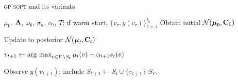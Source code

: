 \newcommand{\bOmega}{\boldsymbol{\Omega}}
\newcommand{\bH}{\mathbf{H}}
\newcommand{\bq}{\mathbf{q}}
\newcommand{\rhos}{\rho}
\newcommand{\cC}{\mathcal{C}}
\newcommand{\blambda}{\boldsymbol{\lambda}}

\newcommand{\COMMENTEQ}[2][4.5em]{%
  \leavevmode\hfill\makebox[#1][l]{//~#2}}



\begin{algorithm}[ht]
	\caption{ \textsc{gp-sopt} and its variants}
	\label{alg:main}
	\begin{algorithmic}[1]
  	\INPUT $\mu_0$, $\mathbf A$, $\omega_0$, $\sigma_n$, $\alpha_t$, $T$;
  	if warm start, $\{v_\tau,y(v_\tau)\}_{\tau=1}^{t_0}$
	\STATE Obtain initial $\mathcal{N}(\boldsymbol \mu_{0},{\mathbf C}_{0})$ 
		\COMMENTEQ{\eqref{eq:generative}}


 	\STATE Update to posterior $\mathcal{N}(\boldsymbol \mu_t, {\mathbf C}_t)$ 
 		\COMMENTEQ{\eqref{eq:var_update}}

 	\STATE $v_{t+1} \leftarrow \operatorname*{\arg\,\max}_{v \in V \setminus S_t} \mu_t(v) + \alpha_{t+1} s_t(v)$

  		\hfill {}

	\STATE Observe $y(v_{t+1})$; include $S_{t+1} \leftarrow S_t \cup \{v_{t+1}\}$
	\ENDFOR
	\OUTPUT $S_T$.
	\end{algorithmic}
\end{algorithm}
%
%
%
%
%
%
%
%
%


